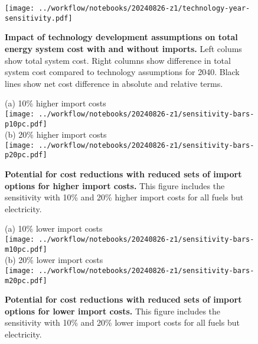 \begin{figure}[!htb]
    \texttt{[image: ../workflow/notebooks/20240826-z1/technology-year-sensitivity.pdf]} \\
    \caption{\textbf{Impact of technology development assumptions on total energy system
    cost with and without imports.} Left colums show total system cost.
    Right columns show difference in total system cost compared to technology
    assumptions for 2040. Black lines show net cost difference in absolute and
    relative terms.}
    \label{fig:si:technology-projection}
\end{figure}

\begin{figure}[!htb]
    \footnotesize
    (a) 10\% higher import costs \\
    \texttt{[image: ../workflow/notebooks/20240826-z1/sensitivity-bars-p10pc.pdf]} \\
    (b) 20\% higher import costs \\
    \texttt{[image: ../workflow/notebooks/20240826-z1/sensitivity-bars-p20pc.pdf]} \\
    \caption{\textbf{Potential for cost reductions with reduced sets of import
    options for higher import costs.} This figure includes the sensitivity with
    10\% and 20\% higher import costs for all fuels but electricity.}
    \label{fig:si:subsets-higher}
\end{figure}




\begin{figure}[!htb]
    \footnotesize
    (a) 10\% lower import costs \\
    \texttt{[image: ../workflow/notebooks/20240826-z1/sensitivity-bars-m10pc.pdf]} \\
    (b) 20\% lower import costs \\
    \texttt{[image: ../workflow/notebooks/20240826-z1/sensitivity-bars-m20pc.pdf]} \\
    \caption{\textbf{Potential for cost reductions with reduced sets of import options for lower import costs.} This figure includes the sensitivity with
    10\% and 20\% lower import costs for all fuels but electricity.}
    \label{fig:si:subsets-lower}
\end{figure}

